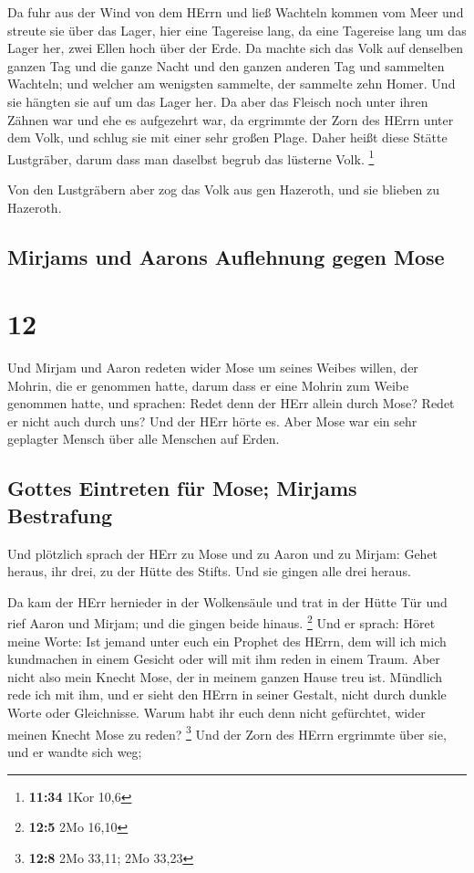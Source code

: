  Da fuhr aus der Wind von dem HErrn und ließ Wachteln
kommen vom Meer und streute sie über das Lager, hier eine Tagereise
lang, da eine Tagereise lang um das Lager her, zwei Ellen hoch über der
Erde.  Da machte sich das Volk auf denselben ganzen Tag
und die ganze Nacht und den ganzen anderen Tag und sammelten Wachteln;
und welcher am wenigsten sammelte, der sammelte zehn Homer. Und sie
hängten sie auf um das Lager her.  Da aber das Fleisch
noch unter ihren Zähnen war und ehe es aufgezehrt war, da ergrimmte der
Zorn des HErrn unter dem Volk, und schlug sie mit einer sehr großen
Plage.  Daher heißt diese Stätte Lustgräber, darum dass
man daselbst begrub das lüsterne Volk. \footnote{\textbf{11:34} 1Kor
  10,6}

 Von den Lustgräbern aber zog das Volk aus gen Hazeroth,
und sie blieben zu Hazeroth.

\hypertarget{mirjams-und-aarons-auflehnung-gegen-mose}{%
\subsection{Mirjams und Aarons Auflehnung gegen
Mose}\label{mirjams-und-aarons-auflehnung-gegen-mose}}

\hypertarget{section-11}{%
\section{12}\label{section-11}}

 Und Mirjam und Aaron redeten wider Mose um seines Weibes
willen, der Mohrin, die er genommen hatte, darum dass er eine Mohrin zum
Weibe genommen hatte,  und sprachen: Redet denn der HErr
allein durch Mose? Redet er nicht auch durch uns? Und der HErr hörte es.
 Aber Mose war ein sehr geplagter Mensch über alle
Menschen auf Erden.

\hypertarget{gottes-eintreten-fuxfcr-mose-mirjams-bestrafung}{%
\subsection{Gottes Eintreten für Mose; Mirjams
Bestrafung}\label{gottes-eintreten-fuxfcr-mose-mirjams-bestrafung}}

 Und plötzlich sprach der HErr zu Mose und zu Aaron und zu
Mirjam: Gehet heraus, ihr drei, zu der Hütte des Stifts. Und sie gingen
alle drei heraus.

 Da kam der HErr hernieder in der Wolkensäule und trat in
der Hütte Tür und rief Aaron und Mirjam; und die gingen beide hinaus.
\footnote{\textbf{12:5} 2Mo 16,10}  Und er sprach: Höret
meine Worte: Ist jemand unter euch ein Prophet des HErrn, dem will ich
mich kundmachen in einem Gesicht oder will mit ihm reden in einem Traum.
 Aber nicht also mein Knecht Mose, der in meinem ganzen
Hause treu ist.  Mündlich rede ich mit ihm, und er sieht
den HErrn in seiner Gestalt, nicht durch dunkle Worte oder Gleichnisse.
Warum habt ihr euch denn nicht gefürchtet, wider meinen Knecht Mose zu
reden? \footnote{\textbf{12:8} 2Mo 33,11; 2Mo 33,23}  Und
der Zorn des HErrn ergrimmte über sie, und er wandte sich weg;

